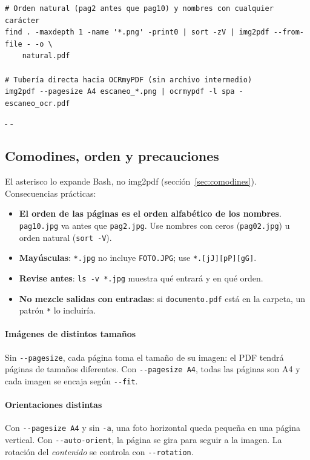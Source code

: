\documentclass[11pt,a4paper]{article}
\makeatletter
\newcommand{\necesitaespacio}[1]{\par\penalty-100\begingroup
	\setlength{\dimen@}{#1}\dimen@ii\pagegoal\advance\dimen@ii-\pagetotal
	\ifdim\dimen@>\dimen@ii\ifdim\dimen@ii>\z@\vfil\fi\penalty-\@M\fi\endgroup}
\newcommand{\cmd}[1]{\texttt{\textcolor{colcmd}{#1}}}      %
\newcommand{\opt}[1]{\texttt{\textcolor{colopt}{#1}}}      %
\newcommand{\arch}[1]{\texttt{\textcolor{colarch}{#1}}}    %
\makeatother
\begin{document}
	\begin{lstlisting}
# Orden natural (pag2 antes que pag10) y nombres con cualquier carácter
find . -maxdepth 1 -name '*.png' -print0 | sort -zV | img2pdf --from-file - -o \
    natural.pdf

# Tubería directa hacia OCRmyPDF (sin archivo intermedio)
img2pdf --pagesize A4 escaneo_*.png | ocrmypdf -l spa - escaneo_ocr.pdf
\end{lstlisting}
	
	\necesitaespacio{8\baselineskip}
	\subsection{Comodines, orden y precauciones}
	
	El asterisco lo expande Bash, no img2pdf (sección~\ref{sec:comodines}). Consecuencias prácticas:
	
	\begin{itemize}
		\item \textbf{El orden de las páginas es el orden alfabético de los nombres}. \arch{pag10.jpg} va antes que \arch{pag2.jpg}. Use nombres con ceros (\arch{pag02.jpg}) u orden natural (\cmd{sort -V}).
		\item \textbf{Mayúsculas}: \arch{*.jpg} no incluye \arch{FOTO.JPG}; use \arch{*.[jJ][pP][gG]}.
		\item \textbf{Revise antes}: \cmd{ls -v *.jpg} muestra qué entrará y en qué orden.
		\item \textbf{No mezcle salidas con entradas}: si \arch{documento.pdf} está en la carpeta, un patrón \arch{*} lo incluiría.
	\end{itemize}
	
	\paragraph{Imágenes de distintos tamaños} Sin \opt{-{}-pagesize}, cada página toma el tamaño de su imagen: el PDF tendrá páginas de tamaños diferentes. Con \opt{-{}-pagesize A4}, todas las páginas son A4 y cada imagen se encaja según \opt{-{}-fit}.
	
	\paragraph{Orientaciones distintas} Con \opt{-{}-pagesize A4} y sin \opt{-a}, una foto horizontal queda pequeña en una página vertical. Con \opt{-{}-auto-orient}, la página se gira para seguir a la imagen. La rotación del \emph{contenido} se controla con \opt{-{}-rotation}.
	
\end{document}
